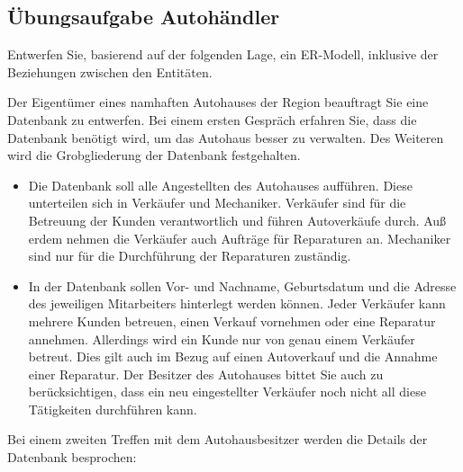       \subsection{Übungsaufgabe Autohändler}
        Entwerfen Sie, basierend auf der folgenden Lage, ein ER-Modell, inklusive der Beziehungen zwischen
        den Entitäten.

        Der Eigentümer eines namhaften Autohauses der Region beauftragt Sie eine Datenbank zu entwerfen.
        Bei einem ersten Gespräch erfahren Sie, dass die Datenbank benötigt wird, um das Autohaus besser zu
        verwalten. Des Weiteren wird die Grobgliederung der Datenbank festgehalten.
        \begin{itemize}
          \item Die Datenbank soll alle Angestellten des Autohauses aufführen. Diese unterteilen sich in Verkäufer und Mechaniker. Verkäufer sind für die Betreuung der Kunden verantwortlich und führen  Autoverkäufe durch. Auß erdem nehmen die Verkäufer auch Aufträge für Reparaturen an. Mechaniker sind nur für die Durchführung der Reparaturen zuständig.
          \item In der Datenbank sollen Vor- und Nachname, Geburtsdatum und die Adresse des jeweiligen Mitarbeiters
          hinterlegt werden können. Jeder Verkäufer kann mehrere Kunden betreuen, einen Verkauf vornehmen oder eine Reparatur annehmen. Allerdings wird ein Kunde nur von genau einem Verkäufer betreut. Dies gilt auch im Bezug auf einen Autoverkauf und die Annahme einer Reparatur. Der Besitzer des Autohauses bittet Sie auch zu berücksichtigen, dass ein neu eingestellter Verkäufer noch nicht all diese Tätigkeiten durchführen kann.
        \end{itemize}
        Bei einem zweiten Treffen mit dem Autohausbesitzer werden die Details der Datenbank besprochen:
